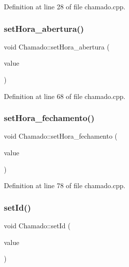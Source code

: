 Definition at line 28 of file chamado.\+cpp.

\hypertarget{class_chamado_a2513e3474003230bee760aeb28da8188}{}\label{class_chamado_a2513e3474003230bee760aeb28da8188} 
\subsubsection{\texorpdfstring{set\+Hora\+\_\+abertura()}{setHora\_abertura()}}
{\footnotesize\ttfamily void Chamado\+::set\+Hora\+\_\+abertura (\begin{DoxyParamCaption}\item[{const Q\+String \&}]{value }\end{DoxyParamCaption})}



Definition at line 68 of file chamado.\+cpp.

\hypertarget{class_chamado_a4517fc2b385ef3ed227289c3444a0208}{}\label{class_chamado_a4517fc2b385ef3ed227289c3444a0208} 
\subsubsection{\texorpdfstring{set\+Hora\+\_\+fechamento()}{setHora\_fechamento()}}
{\footnotesize\ttfamily void Chamado\+::set\+Hora\+\_\+fechamento (\begin{DoxyParamCaption}\item[{const Q\+String \&}]{value }\end{DoxyParamCaption})}



Definition at line 78 of file chamado.\+cpp.

\hypertarget{class_chamado_ad9d1c6ef5c44c56921711fa96ae27277}{}\label{class_chamado_ad9d1c6ef5c44c56921711fa96ae27277} 
\subsubsection{\texorpdfstring{set\+Id()}{setId()}}
{\footnotesize\ttfamily void Chamado\+::set\+Id (\begin{DoxyParamCaption}\item[{int}]{value }\end{DoxyParamCaption})}



